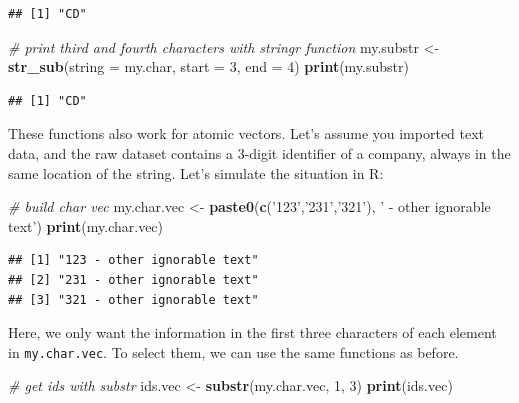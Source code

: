 \documentclass[11pt,]{book}
\newenvironment{Shaded}{\begin{snugshade}}{\end{snugshade}}
\newcommand{\KeywordTok}[1]{\textcolor[rgb]{0.27,0.27,0.27}{\textbf{#1}}}
\newcommand{\DataTypeTok}[1]{\textcolor[rgb]{0.27,0.27,0.27}{#1}}
\newcommand{\DecValTok}[1]{\textcolor[rgb]{0.06,0.06,0.06}{#1}}
\newcommand{\StringTok}[1]{\textcolor[rgb]{0.5,0.5,0.5}{#1}}
\newcommand{\CommentTok}[1]{\textcolor[rgb]{0.56,0.35,0.01}{\textit{#1}}}
\newcommand{\NormalTok}[1]{#1}
\begin{document}
\begin{verbatim}
## [1] "CD"
\end{verbatim}

\begin{Shaded}
\begin{Highlighting}[]
\CommentTok{# print third and fourth characters with stringr function}
\NormalTok{my.substr <-}\StringTok{ }\KeywordTok{str_sub}\NormalTok{(}\DataTypeTok{string =}\NormalTok{ my.char, }\DataTypeTok{start =} \DecValTok{3}\NormalTok{, }\DataTypeTok{end =} \DecValTok{4}\NormalTok{)}
\KeywordTok{print}\NormalTok{(my.substr)}
\end{Highlighting}
\end{Shaded}

\begin{verbatim}
## [1] "CD"
\end{verbatim}

These functions also work for atomic vectors. Let's assume you imported
text data, and the raw dataset contains a 3-digit identifier of a
company, always in the same location of the string. Let's simulate the
situation in R:

\begin{Shaded}
\begin{Highlighting}[]
\CommentTok{# build char vec}
\NormalTok{my.char.vec <-}\StringTok{ }\KeywordTok{paste0}\NormalTok{(}\KeywordTok{c}\NormalTok{(}\StringTok{'123'}\NormalTok{,}\StringTok{'231'}\NormalTok{,}\StringTok{'321'}\NormalTok{), }
                      \StringTok{' - other ignorable text'}\NormalTok{) }
\KeywordTok{print}\NormalTok{(my.char.vec)}
\end{Highlighting}
\end{Shaded}

\begin{verbatim}
## [1] "123 - other ignorable text"
## [2] "231 - other ignorable text"
## [3] "321 - other ignorable text"
\end{verbatim}

Here, we only want the information in the first three characters of each
element in \texttt{my.char.vec}. To select them, we can use the same
functions as before.

\begin{Shaded}
\begin{Highlighting}[]
\CommentTok{# get ids with substr}
\NormalTok{ids.vec <-}\StringTok{ }\KeywordTok{substr}\NormalTok{(my.char.vec, }\DecValTok{1}\NormalTok{, }\DecValTok{3}\NormalTok{)}
\KeywordTok{print}\NormalTok{(ids.vec)}
\end{Highlighting}
\end{Shaded}
\end{document}
